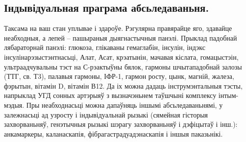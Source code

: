 \subsection{Індывідуальная праграма абсьледаваньня.}
Таксама на ваш стан уплывае і здароўе. Рэгулярна правярайце яго, здавайце неабходныя, а лепей – пашыраныя дыягнастычныя панэлі. Прыклад падобнай лябараторнай панэлі: глюкоза, глікаваны гемаглабін, інсулін, індэкс інсулінарэзыстэнтнасьці, Алат, Асат, крэатынін, мачавая кіслата, гомацыстэін, ультраадчувальны тэст на С-рэактыўны бялок, гармоны шчытападобнай залозы (ТТГ, св. Т3), палавыя гармоны, ІФР-1, гармон росту, цынк, магній, жалеза, фэрытын, вітамін D, вітамін В12. Да іх можна дадаць інструмэнтальныя тэсты, напрыклад УГД сонных артэрыяў з вызначэньнем таўшчыні комплексу інтым-мэдыя. Пры неабходнасьці можна дапаўняць іншымі абсьледаваньнямі, у залежнасьці ад узросту і індывідуальнай рызыкі (сямейная гісторыя захворваньняў, генэтычныя рызыкі шэрагу захворваньняў і дэфіцытаў і інш.): анкамаркеры, каланаскапія, фібрагастрадуадэнаскапія і іншыя паказьнікі.
